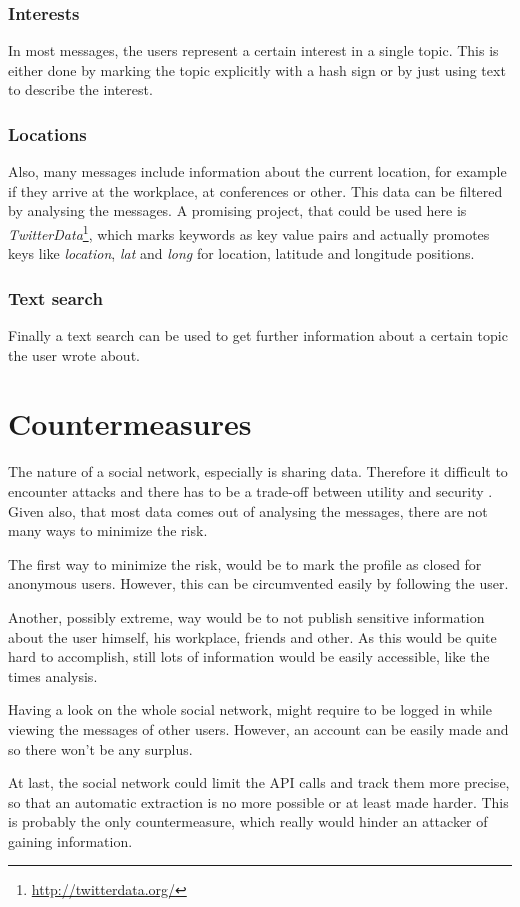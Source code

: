 \subsubsection{Interests}

In most messages, the users represent a certain interest in a single topic.
This is either done by marking the topic explicitly with a hash sign or by just
using text to describe the interest. 

\subsubsection{Locations}

Also, many messages include information about the current location, for example
if they arrive at the workplace, at conferences or other. This data can be
filtered by analysing the messages. A promising project, that could be used
here is \textit{TwitterData}\footnote{\url{http://twitterdata.org/}}, which
marks keywords as key value pairs and actually promotes keys like
\textit{location}, \textit{lat} and \textit{long} for location, latitude and longitude
positions.

\subsubsection{Text search}

Finally a text search can be used to get further information about a certain
topic the user wrote about. 

\section{Countermeasures}

The nature of a social network, especially \Twitter{} is sharing data.
Therefore it difficult to encounter attacks and there has to be a trade-off
between utility and security \cite{brown2008}. Given also, that most data comes
out of analysing the messages, there are not many ways to minimize the risk.

The first way to minimize the risk, would be to mark the profile as closed for
anonymous users. However, this can be circumvented easily by following the
user.

Another, possibly extreme, way would be to not publish sensitive information
about the user himself, his workplace, friends and other. As this would be
quite hard to accomplish, still lots of information would be easily accessible,
like the times analysis.

Having a look on the whole social network, \Twitter{} might require to be
logged in while viewing the messages of other users. However, an account can be
easily made and so there won't be any surplus.

At last, the social network could limit the API calls and track them more
precise, so that an automatic extraction is no more possible or at least made
harder. This is probably the only countermeasure, which really would hinder an
attacker of gaining information.
